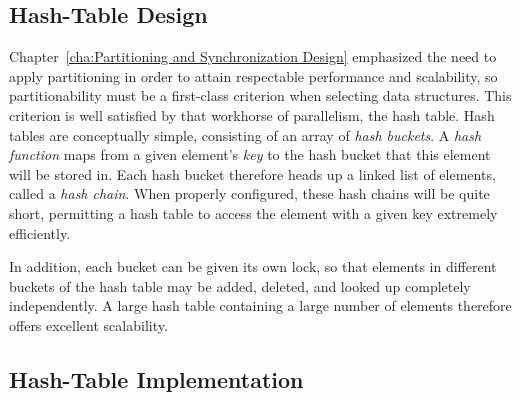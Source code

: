 \subsection{Hash-Table Design}
\label{sec:datastruct:Hash-Table Design}

Chapter~\ref{cha:Partitioning and Synchronization Design}
emphasized the need to apply partitioning in order to attain
respectable performance and scalability, so partitionability
must be a first-class criterion when selecting data structures.
This criterion is well satisfied by that workhorse of parallelism,
the hash table.
Hash tables are conceptually simple, consisting of an array of
\emph{hash buckets}.
A \emph{hash function} maps from a given element's \emph{key}
to the hash bucket that this element will be stored in.
Each hash bucket therefore heads up a linked list of elements,
called a \emph{hash chain}.
When properly configured, these hash chains will be quite short,
permitting a hash table to access the element with a given key
extremely efficiently.

\QuickQuizEnd

In addition, each bucket can be given its own lock, so that
elements in different buckets of the hash table may be added,
deleted, and looked up completely independently.
A large hash table containing a large number of elements therefore
offers excellent scalability.

\subsection{Hash-Table Implementation}
\label{sec:datastruct:Hash-Table Implementation}

